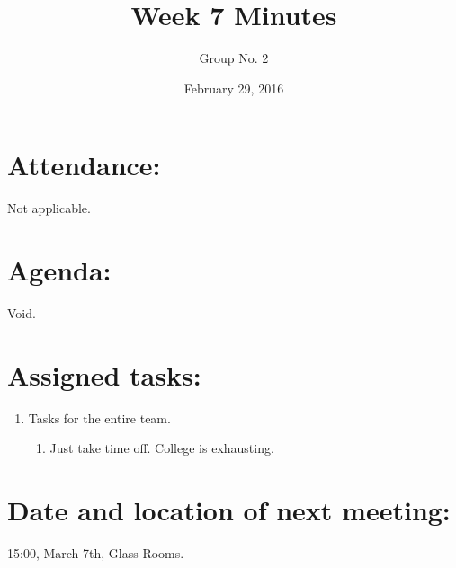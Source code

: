 \documentclass[a4paper, 12pt]{article}
\begin{document}
\title{Week 7 Minutes}
\author{Group No. 2}
\date{February 29, 2016}
\maketitle

	\section{Attendance:}
		\par Not applicable.

	\section{Agenda:}
		\par Void.

	\section{Assigned tasks:}
		\begin{enumerate}[label*=\arabic*.]
			\item Tasks for the entire team.
			\begin{enumerate}[label*=\arabic*.]
				\item Just take time off. College is exhausting.
			\end{enumerate}
		\end{enumerate}

	\section{Date and location of next meeting:}
		15:00, March 7th, Glass Rooms.
\end{document}
